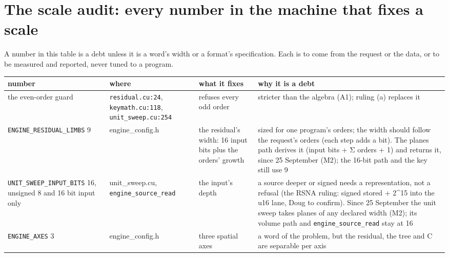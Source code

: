 \section{\texorpdfstring{The scale audit: every number in the machine that fixes a scale}{The scale audit: every number in the machine that fixes a scale}}

A number in this table is a debt unless it is a word's width or a format's specification. Each is to come from the request or the data, or to be measured and reported, never tuned to a program.

{\footnotesize
\setlength{\tabcolsep}{6pt}
\begin{longtable}{>{\RaggedRight\arraybackslash}p{}>{\RaggedRight\arraybackslash}p{}>{\RaggedRight\arraybackslash}p{}>{\RaggedRight\arraybackslash}p{}}
\toprule
number & where & what it fixes & why it is a debt \\
\midrule
\endhead
the even-order guard & \texttt{residual.\allowbreak{}cu:24}, \texttt{keymath.\allowbreak{}cu:118}, \texttt{unit\_\allowbreak{}sweep.\allowbreak{}cu:254} & refuses every odd order & stricter than the algebra (A1); ruling (a) replaces it \\
\texttt{ENGINE\_\allowbreak{}RESIDUAL\_\allowbreak{}LIMBS} 9 & engine\_\allowbreak{}config.h & the residual's width: 16 input bits plus the orders' growth & sized for one program's orders; the width should follow the request's orders (each step adds a bit). The planes path derives it (input bits + Σ orders + 1) and returns it, since 25 September (M2); the 16-bit path and the key still use 9 \\
\texttt{UNIT\_\allowbreak{}SWEEP\_\allowbreak{}INPUT\_\allowbreak{}BITS} 16, unsigned 8 and 16 bit input only & unit\_\allowbreak{}sweep.cu, \texttt{engine\_\allowbreak{}source\_\allowbreak{}read} & the input's depth & a source deeper or signed needs a representation, not a refusal (the RSNA ruling: signed stored + 2\textasciicircum{}15 into the u16 lane, Doug to confirm). Since 25 September the unit sweep takes planes of any declared width (M2); its volume path and \texttt{engine\_\allowbreak{}source\_\allowbreak{}read} stay at 16 \\
\texttt{ENGINE\_\allowbreak{}AXES} 3 & engine\_\allowbreak{}config.h & three spatial axes & a word of the problem, but the residual, the tree and C are separable per axis \\

\end{longtable}}
